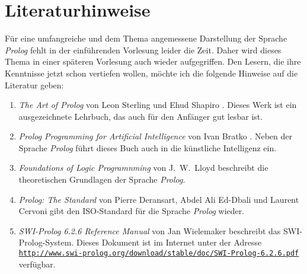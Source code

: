 \section{Literaturhinweise}
Für eine umfangreiche und dem Thema angemessene Darstellung der Sprache \textsl{Prolog} 
fehlt in der einführenden Vorlesung leider die Zeit.  Daher wird dieses Thema in einer
späteren Vorlesung auch wieder aufgegriffen.  Den Lesern, die ihre Kenntnisse jetzt schon
vertiefen wollen, möchte ich die folgende Hinweise auf die Literatur geben:
\begin{enumerate}
\item \emph{The Art of Prolog} von Leon Sterling und Ehud Shapiro \cite{sterling:94}.
      Dieses Werk ist ein ausgezeichnete Lehrbuch, das auch für den Anfänger gut lesbar ist.
\item \emph{Prolog Programming for Artificial Intelligence} von Ivan Bratko
      \cite{bratko:90}.  Neben der Sprache \textsl{Prolog} führt dieses Buch auch in die
      künstliche Intelligenz ein.
\item \emph{Foundations of Logic Programnming}   von J.~W.~Lloyd \cite{lloyd:87}
      beschreibt die theoretischen Grundlagen der Sprache \textsl{Prolog}.
\item \emph{Prolog: The Standard} von Pierre Deransart, Abdel Ali Ed-Dbali und Laurent
      Cervoni \cite{deransart:96} gibt den ISO-Standard für die Sprache
      \textsl{Prolog} wieder.
\item \emph{SWI-Prolog 6.2.6 Reference Manual} von Jan Wielemaker \cite{wielemaker:2013}
      beschreibt das SWI-Prolog-System.  Dieses Dokument ist im Internet unter der Adresse 
      \\[0.1cm]
      \hspace*{1.3cm}      
      \href{http://www.swi-prolog.org/download/stable/doc/SWI-Prolog-6.2.6.pdf}{\texttt{http://www.swi-prolog.org/download/stable/doc/SWI-Prolog-6.2.6.pdf}}
      \\[0.1cm]
      verfügbar.
\end{enumerate}

